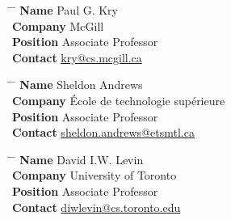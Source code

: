 \documentclass[10pt]{article} %
\begin{document}
\noindent\parbox{0.5\textwidth}{
\begin{tabbing}
\hspace{2.75cm} \= \hspace{4cm} \= \kill
{\bf Name} \> Paul G. Kry\\ 
{\bf Company} \> McGill\\ 
{\bf Position} \> Associate Professor \\ 
{\bf Contact} \> \href{mailto:kry@cs.mcgill.ca}{kry@cs.mcgill.ca}
\end{tabbing}}

\noindent\parbox{0.5\textwidth}{
\begin{tabbing}
\hspace{2.75cm} \= \hspace{4cm} \= \kill
{\bf Name} \> Sheldon Andrews\\ 
{\bf Company} \> École de technologie supérieure\\ 
{\bf Position} \> Associate Professor \\ 
{\bf Contact} \> \href{mailto:sheldon.andrews@etsmtl.ca}{sheldon.andrews@etsmtl.ca}
\end{tabbing}}

\noindent\parbox{0.5\textwidth}{
\begin{tabbing}
\hspace{2.75cm} \= \hspace{4cm} \= \kill
{\bf Name} \> David I.W. Levin\\ 
{\bf Company} \> University of Toronto\\ 
{\bf Position} \>Associate Professor \\ 
{\bf Contact} \> \href{mailto:diwlevin@cs.toronto.edu}{diwlevin@cs.toronto.edu}
\end{tabbing}}


\end{document}
